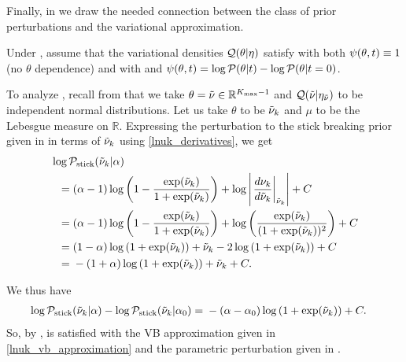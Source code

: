Finally, in  we draw the needed connection between the
class of prior perturbations and the variational approximation.

\begin{assu}
%
Under , assume that the variational densities $\mathcal{Q}(\theta \vert
\eta)$ satisfy  with both $\psi(\theta, t) \equiv 1$ (no
$\theta$ dependence) and with and $\psi(\theta, t) = \log \mathcal{P}(\theta \vert t) -
\log \mathcal{P}(\theta \vert t=0)$.
%
\end{assu}

\begin{ex}
%
To analyze , recall from  that we
take $\theta = \tilde{\nu} \in \mathbb{R}^{{K_{\mathrm{max}}} - 1}$ and $\mathcal{Q}(\tilde{\nu} \vert \eta_{\tilde{\nu}})$ to
be independent normal distributions.  Let us take $\theta$ to be $\tilde{\nu}_{k}$ and
$\mu$ to be the Lebesgue measure on $\mathbb{R}$.  Expressing the perturbation
to the stick breaking prior given in  in terms of
$\tilde{\nu}_{k}$ using \eqref{lnuk_derivatives}, we get
%
\begin{align*}
%
\MoveEqLeft
\log \pstick(\lnuk \vert \alpha)
\\={}&
%
(\alpha - 1) \log\left(1 - \frac{\exp(\lnuk)}{1 + \exp(\lnuk)}\right) +
\log \abs{\fracat{d \nuk}{d \lnuk}{\lnuk}} +
\const
\\={}&
(\alpha - 1) \log\left(1 - \frac{\exp(\lnuk)}{1 + \exp(\lnuk)}\right) +
\log\left(\frac{\exp(\lnuk)}{(1 + \exp(\lnuk))^2}\right) +
    \const
\\={}&
(1 - \alpha) \log\left(1 + \exp(\lnuk)\right) +
\lnuk - 2 \log\left(1 + \exp(\lnuk)\right) + \const
\\={}&
-(1 + \alpha) \log\left(1 + \exp(\lnuk)\right) + \lnuk + \const.
%
\end{align*}

We thus have
%
\begin{align*}
%
\log \pstick(\lnuk \vert \alpha) - \log \pstick(\lnuk \vert \alpha_0)
={}&
    -(\alpha - \alpha_0) \log\left(1 + \exp(\lnuk)\right) + \const.
%
\end{align*}
%
So, by ,  is satisfied with
the VB approximation given in \eqref{lnuk_vb_approximation} and the parametric
perturbation given in .
%
\end{ex}


